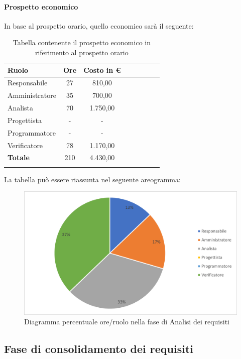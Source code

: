 			\paragraph{Prospetto economico}
			In base al prospetto orario, quello economico sarà il seguente: 
			
			\begin{longtable}{|l|c|c|c|c|c|c|c|}
				\hline
				\rowcolor{lighter-grayer}
				\textbf{Ruolo} & \textbf{Ore} & \textbf{Costo in €} \\
				\hline
				\endfirsthead
				
				\hline
				Responsabile & 27 & 810,00\\
				\hline
				\hline
				Amministratore & 35 & 700,00\\
				\hline
				\hline
				Analista & 70 & 1.750,00\\
				\hline
				\hline
				Progettista & - & -\\
				\hline
				\hline
				Programmatore & - & -\\
				\hline
				\hline
				Verificatore & 78 & 1.170,00\\
				\hline
				\textbf{Totale} & 210 & 4.430,00\\
				\hline
				\rowcolor{white}
				\caption{Tabella contenente il prospetto economico in riferimento al prospetto orario}
			\end{longtable}
			\pagebreak
		
			La tabella può essere riassunta nel seguente areogramma:
			\begin{figure}[H]
				\centering
				\includegraphics[width=0.8\linewidth]{res/images/preventivo/1-2.png}
				\caption{Diagramma percentuale ore/ruolo nella fase di Analisi dei requisiti}
				\label{fig:diagramma costi ruolo fase analisi dei requisiti}
            \end{figure}

            \subsection{Fase di consolidamento dei requisiti}
